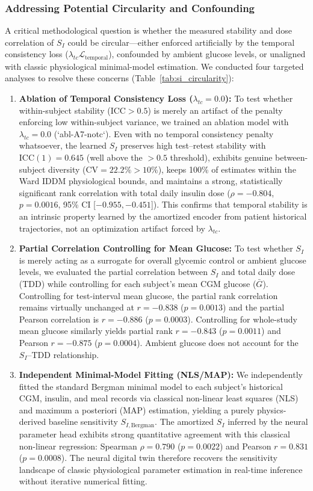 \documentclass[journal]{IEEEtran}
\begin{document}
\subsubsection{Addressing Potential Circularity and Confounding}
A critical methodological question is whether the measured stability and dose correlation of $S_I$ could be circular—either enforced artificially by the temporal consistency loss ($\lambda_{tc} \mathcal{L}_{\text{temporal}}$), confounded by ambient glucose levels, or unaligned with classic physiological minimal-model estimation. We conducted four targeted analyses to resolve these concerns (Table~\ref{tab:si_circularity}):

\begin{enumerate}
    \item \textbf{Ablation of Temporal Consistency Loss ($\lambda_{tc} = 0.0$):} To test whether within-subject stability ($\text{ICC} > 0.5$) is merely an artifact of the penalty enforcing low within-subject variance, we trained an ablation model with $\lambda_{tc} = 0.0$ (`abl-A7-notc`). Even with no temporal consistency penalty whatsoever, the learned $S_I$ preserves high test--retest stability with $\text{ICC}(1) = 0.645$ (well above the $>0.5$ threshold), exhibits genuine between-subject diversity ($\text{CV} = 22.2\% > 10\%$), keeps 100\% of estimates within the Ward IDDM physiological bounds, and maintains a strong, statistically significant rank correlation with total daily insulin dose ($\rho = -0.804$, $p = 0.0016$, 95\% CI [$-0.955, -0.451$]). This confirms that temporal stability is an intrinsic property learned by the amortized encoder from patient historical trajectories, not an optimization artifact forced by $\lambda_{tc}$.
    \item \textbf{Partial Correlation Controlling for Mean Glucose:} To test whether $S_I$ is merely acting as a surrogate for overall glycemic control or ambient glucose levels, we evaluated the partial correlation between $S_I$ and total daily dose (TDD) while controlling for each subject's mean CGM glucose ($\bar{G}$). Controlling for test-interval mean glucose, the partial rank correlation remains virtually unchanged at $r = -0.838$ ($p = 0.0013$) and the partial Pearson correlation is $r = -0.886$ ($p = 0.0003$). Controlling for whole-study mean glucose similarly yields partial rank $r = -0.843$ ($p = 0.0011$) and Pearson $r = -0.875$ ($p = 0.0004$). Ambient glucose does not account for the $S_I$--TDD relationship.
    \item \textbf{Independent Minimal-Model Fitting (NLS/MAP):} We independently fitted the standard Bergman minimal model to each subject's historical CGM, insulin, and meal records via classical non-linear least squares (NLS) and maximum a posteriori (MAP) estimation, yielding a purely physics-derived baseline sensitivity $S_{I,\text{Bergman}}$. The amortized $S_I$ inferred by the neural parameter head exhibits strong quantitative agreement with this classical non-linear regression: Spearman $\rho = 0.790$ ($p = 0.0022$) and Pearson $r = 0.831$ ($p = 0.0008$). The neural digital twin therefore recovers the sensitivity landscape of classic physiological parameter estimation in real-time inference without iterative numerical fitting.

\end{enumerate}
\end{document}
